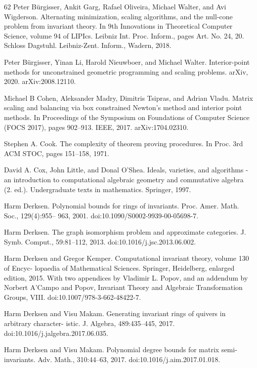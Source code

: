 \documentclass[10pt,a4paper]{article}
\theoremstyle{definition}
\numberwithin{equation}{section}
\begin{document}
\begin{thebibliography}{62}
Peter Bürgisser, Ankit Garg, Rafael Oliveira, Michael Walter, and Avi Wigderson. Alternating minimization, scaling algorithms, and the null-cone problem from invariant theory. In 9th Innovations in Theoretical Computer Science, volume 94 of LIPIcs. Leibniz Int. Proc. Inform., pages Art. No. 24, 20. Schloss Dagstuhl. Leibniz-Zent. Inform., Wadern, 2018.

Peter Bürgisser, Yinan Li, Harold Nieuwboer, and Michael Walter. Interior-point methods for unconstrained geometric programming and scaling problems. arXiv, 2020. arXiv:2008.12110.

Michael B Cohen, Aleksander Madry, Dimitris Tsipras, and Adrian Vladu. Matrix scaling and balancing via box constrained Newton’s method and interior point methods. In Proceedings of the Symposium on Foundations of Computer Science (FOCS 2017), pages 902–913. IEEE, 2017. arXiv:1704.02310.

Stephen A. Cook. The complexity of theorem proving procedures. In Proc. 3rd ACM STOC, pages 151–158, 1971.

David A. Cox, John Little, and Donal O’Shea. Ideals, varieties, and algorithms - an introduction to computational algebraic geometry and commutative algebra (2. ed.). Undergraduate texts in mathematics. Springer, 1997.

Harm Derksen. Polynomial bounds for rings of invariants. Proc. Amer. Math. Soc., 129(4):955– 963, 2001. doi:10.1090/S0002-9939-00-05698-7.

Harm Derksen. The graph isomorphism problem and approximate categories. J. Symb. Comput., 59:81–112, 2013. doi:10.1016/j.jsc.2013.06.002.

Harm Derksen and Gregor Kemper. Computational invariant theory, volume 130 of Encyc- lopaedia of Mathematical Sciences. Springer, Heidelberg, enlarged edition, 2015. With two appendices by Vladimir L. Popov, and an addendum by Norbert A’Campo and Popov, Invariant Theory and Algebraic Transformation Groups, VIII. doi:10.1007/978-3-662-48422-7.

Harm Derksen and Visu Makam. Generating invariant rings of quivers in arbitrary character- istic. J. Algebra, 489:435–445, 2017. doi:10.1016/j.jalgebra.2017.06.035.

Harm Derksen and Visu Makam. Polynomial degree bounds for matrix semi-invariants. Adv. Math., 310:44–63, 2017. doi:10.1016/j.aim.2017.01.018.


\end{thebibliography}
\end{document}
